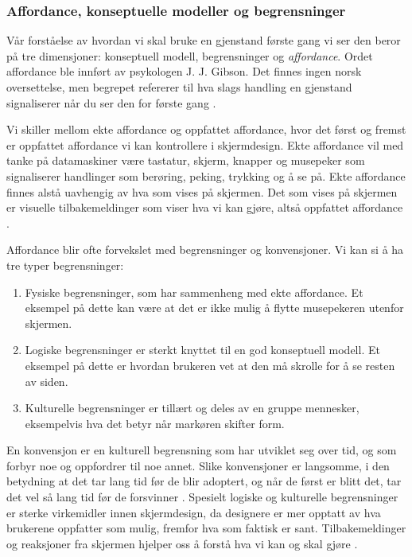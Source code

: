 \subsubsection{Affordance, konseptuelle modeller og begrensninger}
Vår forståelse av hvordan vi skal bruke en gjenstand første gang vi ser den beror på tre dimensjoner: konseptuell modell, begrensninger og \emph{affordance}. Ordet affordance ble innført av psykologen J. J. Gibson. Det finnes ingen norsk oversettelse, men begrepet refererer til hva slags handling en gjenstand signaliserer når du ser den for første gang \cite{Norman99}.

\noindent
Vi skiller mellom ekte affordance og oppfattet affordance, hvor det først og fremst er oppfattet affordance vi kan kontrollere i skjermdesign. Ekte affordance vil med tanke på datamaskiner være tastatur, skjerm, knapper og musepeker som signaliserer handlinger som berøring, peking, trykking og å se på. Ekte affordance finnes alstå uavhengig av hva som vises på skjermen. Det som vises på skjermen er visuelle tilbakemeldinger som viser hva vi kan gjøre, altså oppfattet affordance \cite{Norman99}.

\noindent
Affordance blir ofte forvekslet med begrensninger og konvensjoner. Vi kan si å ha tre typer begrensninger:
\begin{enumerate}
\item Fysiske begrensninger, som har sammenheng med ekte affordance. Et eksempel på dette kan være at det er ikke mulig å flytte musepekeren utenfor skjermen. 
\item Logiske begrensninger er sterkt knyttet til en god konseptuell modell. Et eksempel på dette er hvordan brukeren vet at den må skrolle for å se resten av siden.
\item Kulturelle begrensninger er tillært og deles av en gruppe mennesker, eksempelvis hva det betyr når markøren skifter form.
\end{enumerate}
En konvensjon er en kulturell begrensning som har utviklet seg over tid, og som forbyr noe og oppfordrer til noe annet. Slike konvensjoner er langsomme, i den betydning at det tar lang tid før de blir adoptert, og når de først er blitt det, tar det vel så lang tid før de forsvinner \cite{Norman99}.
\noindent
Spesielt logiske og kulturelle begrensninger er sterke virkemidler innen skjermdesign, da designere er mer opptatt av hva brukerene oppfatter som mulig, fremfor hva som faktisk er sant. Tilbakemeldinger og reaksjoner fra skjermen hjelper oss å forstå hva vi kan og skal gjøre \cite{Norman99}.